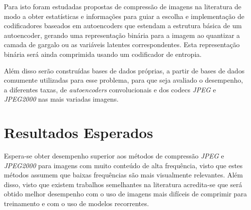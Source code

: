 Para isto foram estudadas propostas de compressão de imagens na literatura de modo a obter estatísticas e informações para guiar a escolha e implementação de codificadores baseados em autoencoders que estendam a estrutura básica de um autoencoder, gerando uma representação binária para a imagem ao quantizar a camada de gargalo ou as variáveis latentes correspondentes. Esta representação binária será ainda comprimida usando um codificador de entropia. 

Além disso serão construídas bases de dados próprias, a partir de bases de dados comumente utilizadas para esse problema, para que seja avaliado o desempenho, a diferentes taxas, de \textit{autoencoders} convolucionais e dos codecs \textit{JPEG} e \textit{JPEG2000} nas mais variadas imagens. 
\section{Resultados Esperados}
\label{sec:expectativa}
Espera-se obter desempenho superior aos métodos de compressão \textit{JPEG} e \textit{JPEG2000} para imagens com muito conteúdo de alta frequência, visto que estes métodos assumem que baixas frequências são mais visualmente relevantes. Além disso, visto que existem trabalhos semelhantes na literatura acredita-se que será obtido melhor desempenho com o uso de imagens mais difíceis de comprimir para treinamento e com o uso de modelos recorrentes. 

